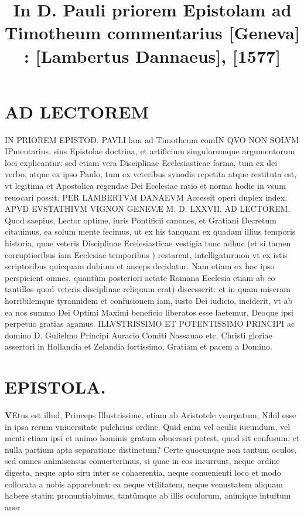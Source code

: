 \documentclass{article}
\begin{document}
\date{}
        \title{In D. Pauli priorem Epistolam ad Timotheum commentarius [Geneva] : [Lambertus Dannaeus], [1577]}
\maketitle
\tableofcontents
\clearpage
\begin{pages} 
\beginnumbering
\section{AD LECTOREM}       
\marginpar{[ p. ]}IN PRIOREM EPISTOD.  PAVLI lam ad Timotheum comIN QVO NON SOLVM IPmentarius. sius Epistolae doctrina, et artificium singulorumque argumentorum loci explicantur: sed etiam vera Disciplinae Ecelesiasticae forma, tum ex dei verbo, atque ex ipso Paulo, tum ex veteribus synodis repetita atque restituta est, vt legitima et Apostolica regendae Dei Ecclesiae ratio et norma hodie in vsum reuocari possit. PER LAMBERTVM DANAEVM Accessit operi duplex index. APVD EVSTATHIVM VIGNON GENEVÆ M. D. LXXVII. \pstart AD LECTOREM. Quod saepius, Lector optime, iuris Pontificii canones, et Gratiani Decretum citauimus, ea solum mente fecimus, ut ex his tanquam ex quadam illius temporis historia, quae veteris Disciplinae Ecelesiasticae vestigia tunc adhuc (et si tamen corruptioribus iam Ecclesiae temporibus ) restarent, intelligatur:non vt ex istis scriptoribus quicquam dubium et anceps decidatur. Nam etiam ex hoc ipso perspicient omnes, quantùm posteriori aetate Romana Ecelesia etiam ab eo tantillos quod veteris disciplinae reliquum erat) discesserit: et in quam miseram horribilemque tyrannidem et confusionem iam, iusto Dei iudicio, inciderit, vt ab ea nos summo Dei Optimi Maximi beneficio liberatos esse laetemur, Deoque ipsi perpetuo gratias agamus.  \pend\pstart ILLVSTRISSIMO ET POTENTISSIMO PRINCIPI ac domino D. Gulielmo Principi Auracio Comiti Nassauao etc.  Christi gloriae assertori in Hollandia et Zelandia fortissimo, Gratiam et pacem a Domino.  \pend\pstart 
\section{EPISTOLA. }
\textbf{V}Etus est illud, Princeps Illustrissime, etiam ab Aristotele vsurpatum, Nihil esse in ipsa rerum vniuersitate pulchrius ordine. Quid enim vel oculis iucundum, vel menti etiam ipsi et animo hominis gratum obuersari potest, quod sit confusum, et nulla partium apta separatione distinctum? Certe quocunque non tantum oculos, sed omnes animisensus conuerterimus, si quae in eos incurrunt, neque ordine digesta, neque apto siru inter se cohaerentia, neque conuenienti loco et modo collocata a nobis apparebunt: ea neque vtilitatem, neque venustatem aliquam habere statim pronuntiabimus, tantûmque ab illis oculorum, animique intuitum auer\pend

\end{pages}
\end{document}
